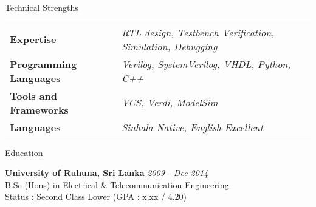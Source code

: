 \documentclass[
11pt, %
]{./assets/resume} %
\begin{document}
\begin{rSection}{Technical Strengths}
	
	\def\arraystretch{1.5}
	
	\begin{tabular}{p{2.0in} p{4.5in}}
		\textbf{Expertise} & \emph{RTL design, Testbench Verification, Simulation, Debugging} \\
		\textbf{Programming Languages} & \emph{Verilog, SystemVerilog, VHDL, Python, C++} \\
		\textbf{Tools and Frameworks} & \emph{VCS, Verdi, ModelSim} \\ 
		\textbf{Languages} & \emph{Sinhala-Native, English-Excellent} \\
	\end{tabular}
	
\end{rSection}


\begin{rSection}{Education}
	
	\textbf{University of Ruhuna, Sri Lanka} \hfill \textit{2009 - Dec 2014} \\ 
	B.Sc (Hons) in Electrical \& Telecommunication Engineering \\
	Status : Second Class Lower (GPA : x.xx / 4.20)
	
\end{rSection}

\end{document}
